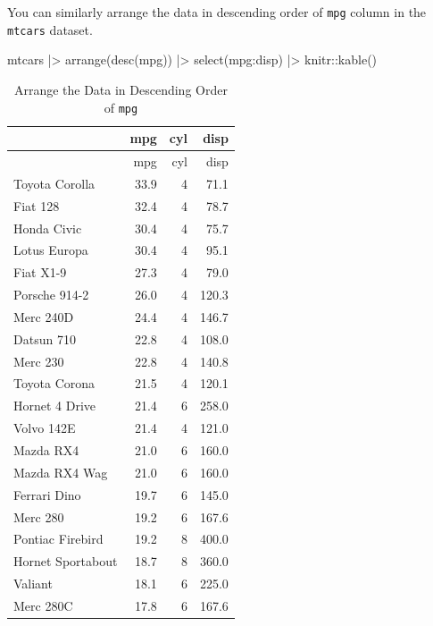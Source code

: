 \documentclass[
  letterpaper,
  paper =a4,
  twoside,
  openright,
  headsepline,
  footsepline,
  listof = totocnumbered,
  chapterprefix = true,
  firstiscover]{scrbook}
\newenvironment{Shaded}{\begin{snugshade}}{\end{snugshade}}
\newcommand{\FunctionTok}[1]{\textcolor[rgb]{0.28,0.35,0.67}{#1}}
\newcommand{\NormalTok}[1]{\textcolor[rgb]{0.00,0.23,0.31}{#1}}
\newcommand{\SpecialCharTok}[1]{\textcolor[rgb]{0.37,0.37,0.37}{#1}}
\begin{document}
You can similarly arrange the data in descending order of \texttt{mpg}
column in the \texttt{mtcars} dataset.

\begin{Shaded}
\begin{Highlighting}[numbers=left,,]
\NormalTok{mtcars }\SpecialCharTok{|\textgreater{}} \FunctionTok{arrange}\NormalTok{(}\FunctionTok{desc}\NormalTok{(mpg)) }\SpecialCharTok{|\textgreater{}} \FunctionTok{select}\NormalTok{(mpg}\SpecialCharTok{:}\NormalTok{disp) }\SpecialCharTok{|\textgreater{}}\NormalTok{ knitr}\SpecialCharTok{::}\FunctionTok{kable}\NormalTok{()}
\end{Highlighting}
\end{Shaded}

\begin{longtable}[]{@{}lrrr@{}}
\caption{Arrange the Data in Descending Order of
\texttt{mpg}}\tabularnewline
\toprule\noalign{}
& mpg & cyl & disp \\
\midrule\noalign{}
\endfirsthead
\toprule\noalign{}
& mpg & cyl & disp \\
\midrule\noalign{}
\endhead
\bottomrule\noalign{}
\endlastfoot
Toyota Corolla & 33.9 & 4 & 71.1 \\
Fiat 128 & 32.4 & 4 & 78.7 \\
Honda Civic & 30.4 & 4 & 75.7 \\
Lotus Europa & 30.4 & 4 & 95.1 \\
Fiat X1-9 & 27.3 & 4 & 79.0 \\
Porsche 914-2 & 26.0 & 4 & 120.3 \\
Merc 240D & 24.4 & 4 & 146.7 \\
Datsun 710 & 22.8 & 4 & 108.0 \\
Merc 230 & 22.8 & 4 & 140.8 \\
Toyota Corona & 21.5 & 4 & 120.1 \\
Hornet 4 Drive & 21.4 & 6 & 258.0 \\
Volvo 142E & 21.4 & 4 & 121.0 \\
Mazda RX4 & 21.0 & 6 & 160.0 \\
Mazda RX4 Wag & 21.0 & 6 & 160.0 \\
Ferrari Dino & 19.7 & 6 & 145.0 \\
Merc 280 & 19.2 & 6 & 167.6 \\
Pontiac Firebird & 19.2 & 8 & 400.0 \\
Hornet Sportabout & 18.7 & 8 & 360.0 \\
Valiant & 18.1 & 6 & 225.0 \\
Merc 280C & 17.8 & 6 & 167.6 \\

\end{longtable}
\end{document}
